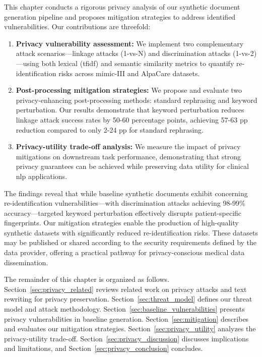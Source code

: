 This chapter conducts a rigorous privacy analysis of our synthetic document generation pipeline and proposes mitigation strategies to address identified vulnerabilities. Our contributions are threefold:

\begin{enumerate}
    \item \textbf{Privacy vulnerability assessment:} We implement two complementary attack scenarios—linkage attacks (1-vs-N) and discrimination attacks (1-vs-2)—using both lexical (\gls{tfidf}) and semantic similarity metrics to quantify re-identification risks across \gls{mimic}-III and AlpaCare datasets.
    
    \item \textbf{Post-processing mitigation strategies:} We propose and evaluate two privacy-enhancing post-processing methods: standard rephrasing and keyword perturbation. Our results demonstrate that keyword perturbation reduces linkage attack success rates by 50-60 percentage points, achieving 57-63 pp reduction compared to only 2-24 pp for standard rephrasing.
    
    \item \textbf{Privacy-utility trade-off analysis:} We measure the impact of privacy mitigations on downstream task performance, demonstrating that strong privacy guarantees can be achieved while preserving data utility for clinical \gls{nlp} applications.
\end{enumerate}

The findings reveal that while baseline synthetic documents exhibit concerning re-identification vulnerabilities—with discrimination attacks achieving 98-99\% accuracy—targeted keyword perturbation effectively disrupts patient-specific fingerprints. Our mitigation strategies enable the production of high-quality synthetic datasets with significantly reduced re-identification risks. These datasets may be published or shared according to the security requirements defined by the data provider, offering a practical pathway for privacy-conscious medical data dissemination.

The remainder of this chapter is organized as follows. Section~\ref{sec:privacy_related} reviews related work on privacy attacks and text rewriting for privacy preservation. Section~\ref{sec:threat_model} defines our threat model and attack methodology. Section~\ref{sec:baseline_vulnerabilities} presents privacy vulnerabilities in baseline generation. Section~\ref{sec:mitigation} describes and evaluates our mitigation strategies. Section~\ref{sec:privacy_utility} analyzes the privacy-utility trade-off. Section~\ref{sec:privacy_discussion} discusses implications and limitations, and Section~\ref{sec:privacy_conclusion} concludes.

